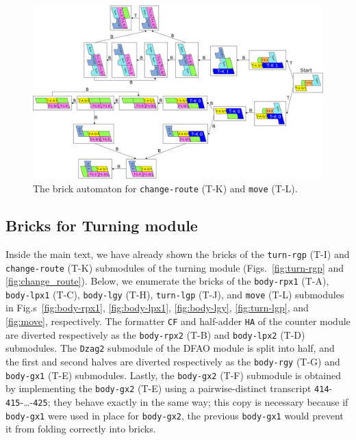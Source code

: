 \documentclass[dvipdfmx,review]{elsarticle}
\begin{document}
\begin{figure}[ht]
\centering
\includegraphics[width=\linewidth]{Figs/Turner_BA/move.png}
\caption{The brick automaton for \texttt{change-route} (T-K) and \texttt{move} (T-L).}
\label{fig:BA_move}
\end{figure}

\clearpage

	\subsection{Bricks for Turning module}
	\label{ap_subsect:Turner_module_bricks}

Inside the main text, we have already shown the bricks of the \texttt{turn-rgp} (T-I) and \texttt{change-route} (T-K) submodules of the turning module (Figs.~\ref{fig:turn-rgp} and \ref{fig:change_route}). 
Below, we enumerate the bricks of the \texttt{body-rpx1} (T-A), \texttt{body-lpx1} (T-C), \texttt{body-lgy} (T-H), \texttt{turn-lgp} (T-J), and \texttt{move} (T-L) submodules in Fig.s~\ref{fig:body-rpx1}, \ref{fig:body-lpx1}, \ref{fig:body-lgy}, \ref{fig:turn-lgp}, and \ref{fig:move}, respectively. 
The formatter \texttt{CF} and half-adder \texttt{HA} of the counter module are diverted respectively as the \texttt{body-rpx2} (T-B) and \texttt{body-lpx2} (T-D) submodules. 
The \texttt{Dzag2} submodule of the DFAO module is split into half, and the first and second halves are diverted respectively as the \texttt{body-rgy} (T-G) and \texttt{body-gx1} (T-E) submodules. 
Lastly, the \texttt{body-gx2} (T-F) submodule is obtained by implementing the \texttt{body-gx2} (T-E) using a pairwise-distinct transcript \texttt{414}-\texttt{415}-\dots-\texttt{425}; they behave exactly in the same way; this copy is necessary because if \texttt{body-gx1} were used in place for \texttt{body-gx2}, the previous \texttt{body-gx1} would prevent it from folding correctly into bricks. 
\end{document}
